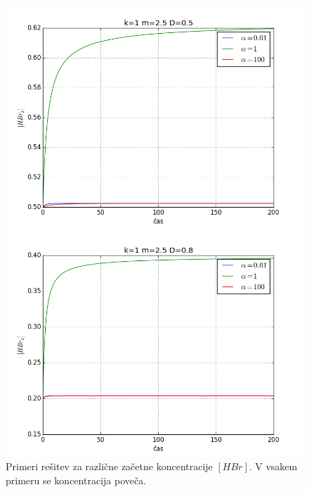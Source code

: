 \documentclass[slovene,11pt,a4paper]{article}
\numberwithin{equation}{section} %
\numberwithin{figure}{section} %
\numberwithin{table}{section} %
\begin{document}
\begin{figure}[h]
{\begin{minipage}[t]{0.5\paperwidth}
\begin{flushleft}

\includegraphics[scale=0.4]{slike/druga_druga_D_0_5_png}
\hspace{\fill}
\end{flushleft}
\end{minipage}
\begin{minipage}[t]{0.5\paperwidth}
\includegraphics[scale=0.4]{slike/druga_druga_D_0_8_png}
\end{minipage}%
}
\caption{Primeri rešitev za različne začetne koncentracije $[HBr]$. V vsakem primeru se koncentracija poveča.}
\end{figure}
\end{document}
